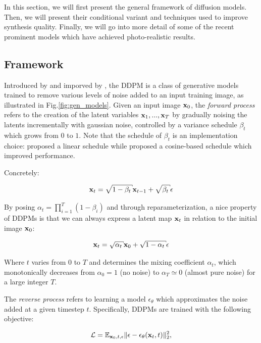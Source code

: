 In this section, we will first present the general framework of diffusion models. Then, we will 
present their conditional variant and techniques used to improve synthesis quality. Finally, 
we will go into more detail of some of the recent prominent models which have achieved photo-realistic 
results.

\subsection{Framework}

Introduced by \cite{sohl2015deep} and imporved by \cite{ho2020denoising}, the \ac{DDPM} is a class 
of generative models trained to remove various levels of noise added to an input training image, as illustrated in Fig.\ref{fig:gen_models}.
Given an input image $\mathbf{x}_0$, the \emph{forward process} refers to the creation of the latent variables 
$\mathbf{x}_1, ..., \mathbf{x}_T$ by gradually noising the latents incrementally with gaussian noise, controlled by 
a variance schedule ${\beta_t}$ which grows from $0$ to $1$. Note that the schedule of 
$\beta_t$ is an implementation choice: \cite{ho2020denoising} proposed a linear schedule while 
\cite{dhariwal2021diffusion} proposed a cosine-based schedule which improved performance.

Concretely:

\begin{equation}
      \x_t = \sqrt{1 - \beta_t} \x_{t-1} +  \sqrt{\beta_t} \epsilon
\end{equation}

By posing $\alpha_t = \prod_{i=1}^{T} (1 - \beta_i)$ and through reparameterization, 
a nice property of \ac{DDPM}s is that we can always express a latent map $\mathbf{x}_t$ in relation 
to the initial image $\mathbf{x}_0$:

\begin{equation}
      \x_t = \sqrt{\alpha_t} \x_0 +  \sqrt{1 - \alpha_t} \epsilon
\end{equation}

Where $t$ varies from $0$ to $T$ and determines the mixing coefficient $\alpha_t$, which monotonically 
decreases from  $\alpha_0 = 1$ (no noise) to $\alpha_T \simeq 0$ (almost pure noise) for a large integer $T$.


The \emph{reverse process} refers to learning a model  $\epsilon_\theta$  which approximates the noise added at a given 
timestep $t$. Specifically, \ac{DDPM}s are trained with the following objective:

\begin{equation}
      \mathcal{L} = \displaystyle \mathbb{E}_{\mathbf{x}_0, t, \epsilon} \Vert \epsilon - \epsilon_\theta(\mathbf{x}_t, t) \Vert_2^2,
\end{equation}


